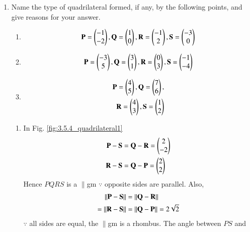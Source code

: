 \begin{enumerate}[label=\thesubsection.\arabic*.,ref=\thesubsection.\theenumi]
\begin{enumerate}
\end{enumerate}
\item Name the type of quadrilateral formed, if any, by the following points, and give reasons for your answer.
\begin{enumerate}
\item 
\begin{align}
\mathbf{P} = \begin{pmatrix}-1\\-2\end{pmatrix}, \mathbf{Q} =\begin{pmatrix}1\\0\end{pmatrix},
\mathbf{R} =\begin{pmatrix}-1\\2\end{pmatrix}, \mathbf{S} =\begin{pmatrix}-3\\0\end{pmatrix}
\end{align}
\item 
\begin{align}
\mathbf{P} = \begin{pmatrix}-3\\5\end{pmatrix}, \mathbf{Q} =\begin{pmatrix}3\\1\end{pmatrix},
\mathbf{R} =\begin{pmatrix}0\\3\end{pmatrix}, \mathbf{S} =\begin{pmatrix}-1\\-4\end{pmatrix}
\end{align}
\item 
\begin{align}
\mathbf{P} = \begin{pmatrix}4\\5\end{pmatrix}, \mathbf{Q} =\begin{pmatrix}7\\6\end{pmatrix},
\\
\mathbf{R} =\begin{pmatrix}4\\3\end{pmatrix}, \mathbf{S} =\begin{pmatrix}1\\2\end{pmatrix}
\end{align}
\end{enumerate}
\solution
\begin{enumerate}
\item In Fig. 	\ref{fig:3.5.4_quadrilateral1}
\begin{align}
\label{eq:constr_vectors_quad1_PSQR}
 \mathbf{P} - \mathbf{S} &= 
 \mathbf{Q} - \mathbf{R} = \begin{pmatrix}2\\-2\end{pmatrix}
\\
\mathbf {R} - \mathbf {S} &=
 \mathbf {Q} - \mathbf {P} = \begin{pmatrix}2\\2\end{pmatrix}
\label{eq:constr_vectors_quad1_RSQP}
\end{align}
%
Hence $PQRS$ is a $\parallel$gm $\because$  opposite sides are parallel. Also, 
\begin{align}
\left\lVert \mathbf{P} - \mathbf{S}\right\rVert &= 
\left\lVert \mathbf{Q} - \mathbf{R}\right\rVert 
\\
=\left\lVert\mathbf {R} - \mathbf {S}\right\rVert &=
\left\lVert \mathbf {Q} - \mathbf {P}\right\rVert = 2\sqrt{2}
\end{align}
%
$\because$ all sides are equal, the $\parallel$gm is a rhombus. The angle between $PS$ and

\end{enumerate}
\end{enumerate}
